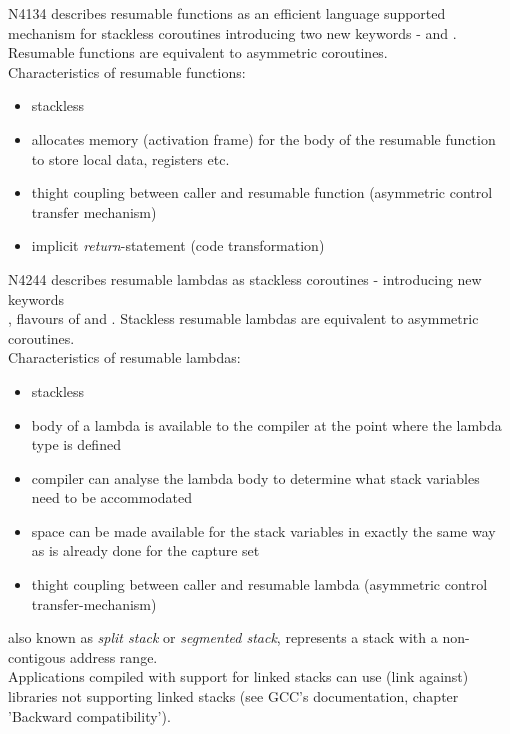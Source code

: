 N4134\cite{N4134} describes resumable functions as an efficient language
supported mechanism for stackless coroutines introducing two new keywords -
\await and \yield. Resumable functions are equivalent to asymmetric coroutines.\\
Characteristics of resumable functions:
\begin{itemize}
    \item stackless
    \item allocates memory (activation frame) for the body of the resumable
          function to store local data, registers etc.
    \item thight coupling between caller and resumable function (asymmetric
          control transfer mechanism)
    \item implicit \textit{return}-statement\cite{N4134} (code transformation)
\end{itemize}

N4244\cite{N4244} describes resumable lambdas as stackless coroutines -
introducing new keywords\\
\resumable, flavours of \yield and \rlthis. Stackless resumable lambdas are
equivalent to asymmetric coroutines.\\
Characteristics of resumable lambdas:
\begin{itemize}
    \item stackless
    \item body of a lambda is available to the compiler at the point
          where the lambda type is defined
    \item compiler can analyse the lambda body to determine what stack
          variables need to be accommodated
    \item space can be made available for the stack variables in exactly the
          same way as is already done for the capture set
    \item thight coupling between caller and resumable lambda (asymmetric
          control transfer-mechanism)
\end{itemize}

also known as \textit{split stack}\cite{gccsplit} or
\textit{segmented stack}\cite{llvmseg}, represents a stack with a non-contigous
address range.\\
Applications compiled with support for linked stacks can use (link against)
libraries not supporting linked stacks (see GCC's documentation\cite{gccsplit},
chapter 'Backward compatibility').
